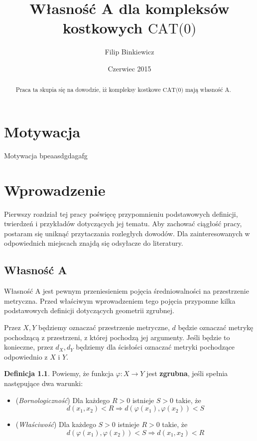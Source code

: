 \documentclass[licencjacka]{pracamgr}
\author{Filip Binkiewicz}
\title{Własność A dla kompleksów kostkowych $\text{CAT(0)}$}
\date{Czerwiec 2015}
\theoremstyle{definition}
\newtheorem{definition}{Definicja}[section]
\theoremstyle{definition}
\theoremstyle{definition}
\theoremstyle{definition}
\theoremstyle{definition}
\theoremstyle{plain}
\theoremstyle{plain}
\begin{document}
\maketitle


\begin{abstract}
	Praca ta skupia się na dowodzie, iż kompleksy kostkowe $\text{CAT(0)} $
	mają własność A.
\end{abstract}

\tableofcontents

\chapter*{Motywacja}

Motywacja bpeaasdgdagafg

\chapter{Wprowadzenie}

Pierwszy rozdział tej pracy poświęcę przypomnieniu podstawowych definicji, 
twierdzeń i przykładów dotyczących jej tematu. Aby zachować ciągłość pracy, 
postaram się uniknąć przytaczania rozległych dowodów. Dla zainteresowanych 
w odpowiednich miejscach znajdą się odsyłacze do literatury.

\section{Własność A}

Własność A jest pewnym przeniesieniem pojęcia średniowalności na przestrzenie metryczna. 
Przed właściwym wprowadzeniem tego pojęcia przypomne kilka podstawowych 
definicji dotyczących geometrii zgrubnej.

Przez $ X,Y $ będziemy oznaczać przestrzenie metryczne, $ d $ będzie oznaczać metrykę 
pochodzącą z przestrzeni, z której pochodzą jej argumenty. Jeśli będzie to konieczne, 
przez $ d_X, d_Y $ będziemy dla ścisłości oznaczać metryki pochodzące odpowiednio z $ X $ 
i $ Y $.

\begin{definition}
	Powiemy, że funkcja $ \varphi: X \rightarrow Y $ jest \textbf{zgrubna}, jeśli 
	spełnia następujące dwa warunki:
	\begin{itemize}
	\item (\textit{Bornologiczność}) Dla każdego $ R > 0 $ istnieje $ S > 0 $ 
	takie, że 
	$$ d(x_1,x_2) < R \Rightarrow d \left( \varphi(x_1), \varphi(x_2)\right) < S $$
	\item (\textit{Właściwość}) Dla każdego $ S > 0 $ istnieje $ R > 0 $ takie, że 
	$$ d\left(\varphi(x_1), \varphi(x_2)\right) < S \Rightarrow d(x_1,x_2) < R $$
	\end{itemize}
\end{definition}
\end{document}
